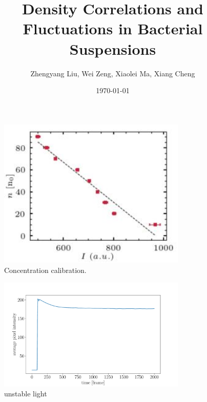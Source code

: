 \documentclass[11px]{article}
\title{Density Correlations and Fluctuations in Bacterial Suspensions}
\author{Zhengyang Liu, Wei Zeng, Xiaolei Ma, Xiang Cheng}
\date{\today}
\begin{document}
\maketitle

\begin{figure}[h]
\begin{center}
\includegraphics[width=0.8\textwidth]{fig-s1_conc-calibration.jpg}
\caption[]{Concentration calibration.}
\end{center}
\label{fig:s1}
\end{figure}


\begin{figure}[h]
\begin{center}
\includegraphics[width=0.8\textwidth]{fig-s2_unstable-light.pdf}
\caption[]{unstable light}
\end{center}
\label{fig:s2}
\end{figure}
\end{document}
